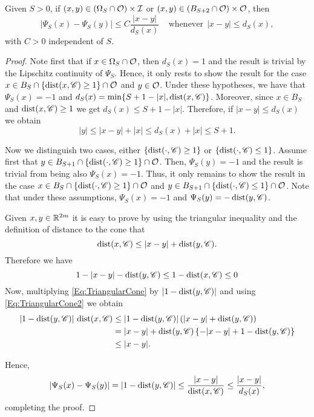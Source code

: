 \begin{lemma}
\label{Lemma: AdaptedLipschitzConditionWith_dFunction}
Given $S>0$, if $(x,y) \in \left(\Omega_S\cap \mathcal{O}\right) \times \mathcal{I}$ or $(x,y)\in \left(B_{S+2}\cap \mathcal{O}\right) \times \mathcal{O}$, then
$$ |\Psi_S(x) - \Psi_S(y)| \leq C \frac{|x-y|}{d_S(x)} \ \ \ \ \ \textrm{whenever} \ \ |x-y|\leq d_S(x), $$
with $C>0$ independent of $S$.
\end{lemma}

\begin{proof}
Note first that if $x\in \Omega_S \cap \mathcal{O}$, then $d_S(x)=1$ and the result is trivial by the Lipschitz continuity of $\Psi_S$. Hence, it only rests to show the result for the case $x\in B_S\cap \{\operatorname{dist}(x,\mathscr{C})\geq 1\} \cap \mathcal{O}$ and $y\in \mathcal{O}$. Under these hypotheses, we have that $\Psi_S(x)=-1$ and $d_S(x) = \min\{S+1-|x|,\operatorname{dist}(x,\mathscr{C})\}$. Moreover, since $x\in B_S$ and $\operatorname{dist}(x,\mathscr{C})\geq 1$ we get $d_S(x) \leq S+1-|x|$. Therefore, if $|x-y|\leq d_S(x)$ we obtain
$$ |y|\leq |x-y| + |x| \leq d_S(x)+|x| \leq S+1. $$

Now we distinguish two cases, either $\{\operatorname{dist}(\cdot,\mathscr{C})\geq 1\}$ or $\{\operatorname{dist}(\cdot,\mathscr{C})\leq 1\}$. Assume first that $y\in B_{S+1} \cap \{\operatorname{dist}(\cdot,\mathscr{C})\geq 1\}\cap \mathcal{O}$. Then, $\Psi_S(y)=-1$ and the result is trivial from being also $\Psi_S(x)=-1$. Thus, it only remains to show the result in the case $x\in B_S \cap \{\operatorname{dist}(\cdot,\mathscr{C})\geq 1\}\cap \mathcal{O}$ and $y\in B_{S+1} \cap \{\operatorname{dist}(\cdot,\mathscr{C})\leq 1\}\cap \mathcal{O}$. Note that under these assumptions, $\Psi_S(x)=-1$ and $\Psi_S(y)=-\operatorname{dist}(y,\mathscr{C})$.


Given $x,y \in \mathbb{R}^{2m}$ it is easy to prove by using the triangular inequality and the definition of distance to the cone that
\begin{equation} \label{Eq:TriangularCone}
\operatorname{dist}(x,\mathscr{C}) \leq |x-y| + \operatorname{dist}(y,\mathscr{C}).
\end{equation}
Therefore we have
\begin{equation} \label{Eq:TriangularCone2}
1-|x-y|-\operatorname{dist}(y,\mathscr{C}) \leq 1-\operatorname{dist}(x,\mathscr{C}) \leq 0
\end{equation}
Now, multiplying \eqref{Eq:TriangularCone} by $|1-\operatorname{dist}(y,\mathscr{C})|$ and using \eqref{Eq:TriangularCone2} we obtain
\begin{align*}
|1-\operatorname{dist}(y,\mathscr{C})|\,\operatorname{dist}(x,\mathscr{C}) &\leq |1-\operatorname{dist}(y,\mathscr{C})| \left(|x-y| + \operatorname{dist}(y,\mathscr{C})\right) \\
&= |x-y|+\operatorname{dist}(y,\mathscr{C}) \left\{ -|x-y|+ 1- \operatorname{dist}(y,\mathscr{C}) \right\} \\
&\leq |x-y|.
\end{align*}

Hence,
$$ |\Psi_S(x)-\Psi_S(y)| = |1-\operatorname{dist}(y,\mathscr{C})| \leq \frac{|x-y|}{\operatorname{dist}(x,\mathscr{C})} \leq  \frac{|x-y|}{d_S(x)},$$
completing the proof.
\end{proof}

